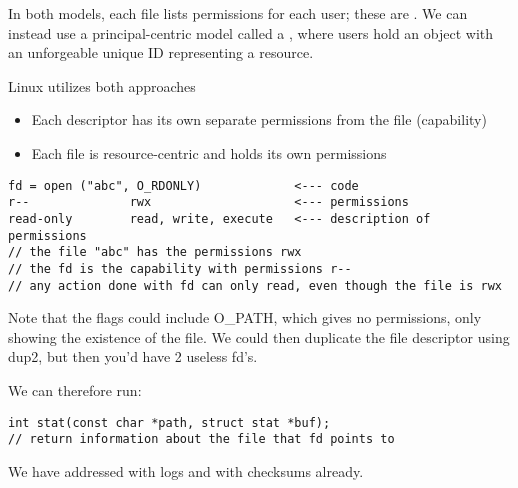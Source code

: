 \documentclass[../../lecture_notes.tex]{subfiles}
\begin{document}
In both models, each file lists permissions for each user; these are . We can instead use a principal-centric model called a , where users hold an object with an unforgeable unique ID representing a resource.
    

Linux utilizes both approaches
\begin{itemize}
\item Each descriptor has its own separate permissions from the file (capability)
\item Each file is resource-centric and holds its own permissions
\end{itemize}
\begin{lstlisting}
fd = open ("abc", O_RDONLY)             <--- code
r--              rwx                    <--- permissions
read-only        read, write, execute   <--- description of permissions
// the file "abc" has the permissions rwx
// the fd is the capability with permissions r--
// any action done with fd can only read, even though the file is rwx
\end{lstlisting}

Note that the flags could include O\_PATH, which gives no permissions, only showing the existence of the file. We could then duplicate the file descriptor using dup2, but then you'd have 2 useless fd's.

We can therefore run:
\begin{lstlisting}
int stat(const char *path, struct stat *buf);
// return information about the file that fd points to
\end{lstlisting}

We have addressed  with logs and  with checksums already.
\end{document}
